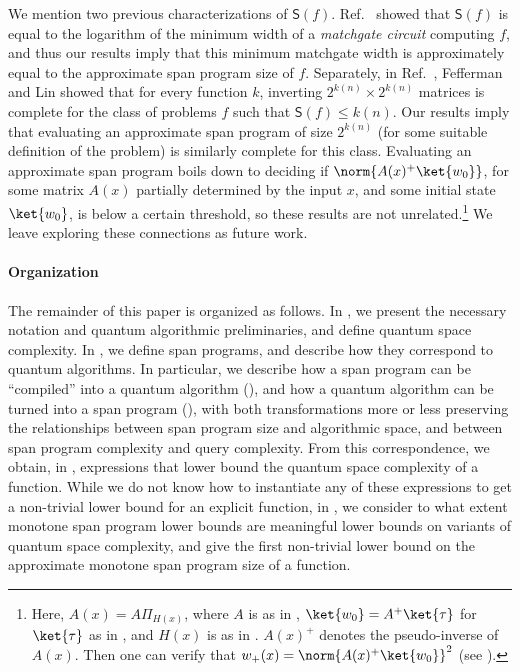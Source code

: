\documentclass{toc}
\begin{document}
We mention two previous characterizations of $\mathsf{S}(f)$. 
Ref.~\cite{JKMW09} showed that $\mathsf{S}(f)$ is equal to the logarithm of the minimum width of a \emph{matchgate circuit} computing $f$, and thus our results imply that this minimum matchgate width is approximately equal to the approximate span program size of $f$. 
Separately, in Ref.~\cite{FL18}, Fefferman and Lin showed that for every function $k$, inverting $2^{k(n)}\times 2^{k(n)}$ matrices is complete for the class of problems $f$ such that $\mathsf{S}(f)\leq k(n)$. Our results imply that evaluating an approximate span program of size $2^{k(n)}$ (for some suitable definition of the problem) is similarly complete for this class. Evaluating an approximate span program boils down to deciding if $\norm{A(x)^+\ket{w_0}}$, for some matrix $A(x)$ partially determined by the input $x$, and some initial state $\ket{w_0}$, is below a certain threshold, so these results are not 
unrelated.\footnote{Here, $A(x)=A\Pi_{H(x)}$, where $A$ is as in , $\ket{w_0}=A^+\ket{\tau}$ for $\ket{\tau}$ as in , and $H(x)$ is as in . $A(x)^+$ denotes the pseudo-inverse of $A(x)$. Then one can verify that $w_+(x)=\norm{A(x)^+\ket{w_0}}^2$ (see ).}
We leave exploring these connections as future work. 








\paragraph{Organization} The remainder of this paper is organized as follows. In , we present the necessary notation and quantum algorithmic preliminaries, and define quantum space complexity. In , we define span programs, and describe how they correspond to quantum algorithms. In particular, we describe how a span program can be ``compiled'' into a quantum algorithm (), and how a quantum algorithm can be turned into a span program (), with both transformations more or less preserving the relationships between span program size and algorithmic space, and between span program complexity and query complexity. From this correspondence, we obtain, in , expressions that lower bound the quantum space complexity of a function. While we do not know how to instantiate any of these expressions to get a non-trivial lower bound for
%
an explicit  %
function, in , we consider to what extent monotone span program lower bounds are meaningful lower bounds on variants of quantum space complexity, and give the first non-trivial lower bound on the approximate monotone span program size of a function.
\end{document}
